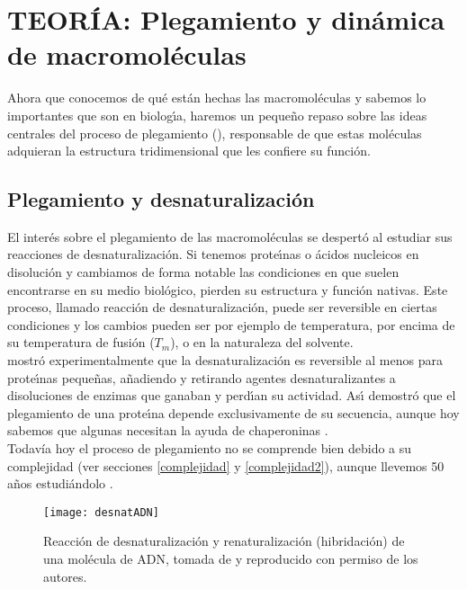\chapter{TEOR\'{I}A: Plegamiento y din\'{a}mica de macromol\'{e}culas} \label{macro2}

Ahora que conocemos de qu\'{e} est\'{a}n hechas las macromol\'{e}culas y sabemos lo importantes que son 
en biolog\'\i{}a, haremos un peque\~no repaso sobre las ideas centrales del proceso de plegamiento
(), responsable de que estas mol\'{e}culas adquieran la estructura tridimensional 
que les confiere su funci\'{o}n.

\section{Plegamiento y desnaturalizaci\'{o}n} \label{desnat}

El inter\'{e}s sobre el plegamiento de las macromol\'{e}culas se despert\'{o} al estudiar sus reacciones
de desnaturalizaci\'{o}n. Si tenemos prote\'\i{}nas o \'{a}cidos nucleicos en disoluci\'{o}n y cambiamos de 
forma notable las condiciones en que suelen encontrarse en su medio biol\'{o}gico, pierden su 
estructura y funci\'{o}n nativas. Este proceso, llamado reacci\'{o}n de desnaturalizaci\'{o}n, puede ser 
reversible en ciertas condiciones y los cambios pueden ser por ejemplo de temperatura, por 
encima de su temperatura de fusi\'{o}n ($T_{m}$), o en la naturaleza del solvente.\\ 

\citet{Anfinsen1961} mostr\'{o} experimentalmente que la desnaturalizaci\'{o}n es reversible al menos para 
prote\'\i{}nas peque\~nas, a\~nadiendo y retirando agentes desnaturalizantes a disoluciones de enzimas 
que ganaban y perd\'\i{}an su actividad. As\'\i{} demostr\'{o} que el plegamiento de una prote\'\i{}na depende 
exclusivamente de su secuencia, aunque hoy sabemos que algunas necesitan la ayuda de 
chaperoninas \citep{Hartl2002}.\\

Todav\'{i}a hoy el proceso de plegamiento no se comprende bien debido a su complejidad 
(ver secciones \ref{complejidad} y \ref{complejidad2}), aunque llevemos 50 a\~{n}os estudi\'{a}ndolo \citep{Dill2012}.

\begin{figure}
\begin{center} 
\texttt{[image: desnatADN]}
\caption%
{
Reacci\'{o}n de desnaturalizaci\'{o}n y renaturalizaci\'{o}n (hibridaci\'{o}n) de una mol\'{e}cula de ADN,
tomada de \citet{HernandezLemus2012} y reproducido con permiso de los autores.
}
\label{fig:desnatADN}
\end{center}
\end{figure}

